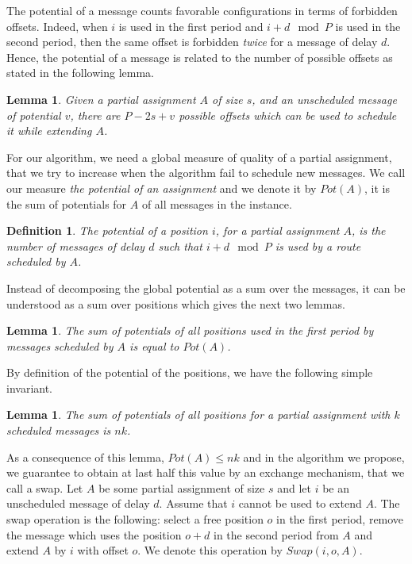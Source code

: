 \documentclass[10pt, conference, letterpaper]{IEEEtran}
\newtheorem{lemma}[theorem]{Lemma}
\newtheorem{definition}{Definition}
\begin{document}
The potential of a message counts favorable configurations in terms of forbidden offsets.
Indeed, when $i$ is used in the first period and $i+d \mod P$ is used in the second period,
then the same offset is forbidden \emph{twice} for a message of delay $d$. Hence, the potential of a message is related to the number of possible offsets as stated in the following lemma. 

\begin{lemma}
Given a partial assignment $A$ of size $s$, and an unscheduled message of potential 
$v$, there are $P - 2s + v$ possible offsets which can be used to schedule it while extending $A$.
\end{lemma}

For our algorithm, we need a global measure of quality of a partial assignment, 
that we try to increase when the algorithm fail to schedule new messages. 
We call our measure \emph{the potential of an assignment} and we denote it by $Pot(A)$, it is the sum of potentials for $A$ of all messages in the instance.


\begin{definition}
The potential of a position $i$, for a partial assignment $A$, is the number of messages of delay $d$ such that $i+d \mod P$ is used by a route scheduled by $A$. 
\end{definition}

Instead of decomposing the global potential as a sum over the messages, it can be understood
as a sum over positions which gives the next two lemmas.

\begin{lemma}\label{lemma:pot_pos}
The sum of potentials of all positions used in the first period by messages scheduled by $A$ is equal to $Pot(A)$.  
\end{lemma}

By definition of the potential of the positions, we have the following simple invariant.

\begin{lemma}\label{lemma:inv}
The sum of potentials of all positions for a partial assignment with $k$ scheduled messages is $nk$.  
\end{lemma}

 As a consequence of this lemma, $Pot(A) \leq nk$ and in the algorithm we 
 propose, we guarantee to obtain at last half this value by an exchange mechanism, that we call a swap.
Let $A$ be some partial assignment of size $s$ and let $i$ be an unscheduled message of delay $d$. 
Assume that $i$ cannot be used to extend $A$. The swap operation is the following: 
select a free position $o$ in the first period, remove the message which uses the position $o+d$ in the second period from $A$ and extend $A$ by $i$ with offset $o$. We denote this operation by $Swap(i,o,A)$.
\end{document}
